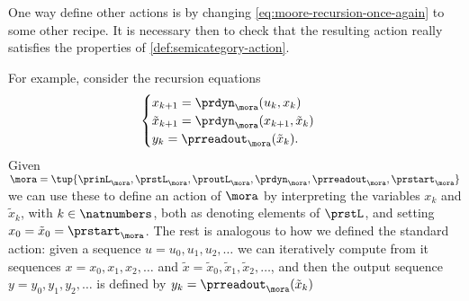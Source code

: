 One way define other actions is by changing \cref{eq:moore-recursion-once-again} to some other recipe. It is necessary then to check that the resulting action really satisfies the properties of \cref{def:semicategory-action}. 

For example, consider the recursion equations
\begin{equation}
\label{eq:moore-new-recursion-equations}
    \begin{cases}
        x_{k+1} = \prdyn_\mora(u_k, x_k) \\
        \tilde x_{k+1} = \prdyn_\mora(x_{k+1}, \tilde x_k) \\
        y_{k}   = \prreadout_\mora(\tilde x_{k}).
    \end{cases}
\end{equation}
Given  $\mora = \tup{\prinL_\mora,\prstL_\mora,\proutL_\mora,\prdyn_\mora,\prreadout_\mora,\prstart_\mora}$ we can use these to define an action of $\mora$ by interpreting the variables $x_k$ and $\tilde x_k$, with $k \in \natnumbers$, both as denoting elements of $\prstL$, and setting $x_0 = \tilde x_0 = \prstart_\mora$. The rest is analogous to how we defined the standard action: given a sequence $u = u_0, u_1, u_2, \dots$ we can iteratively compute from it sequences $x = x_0, x_1, x_2, \dots $ and $\tilde x = \tilde x_0, \tilde x_1, \tilde x_2, \dots$, and then the output sequence $y = y_0, y_1, y_2, \dots $ is defined by $y_{k}   = \prreadout_\mora(\tilde x_{k})$


